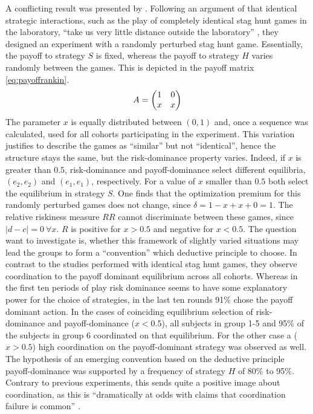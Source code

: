 A conflicting result was presented by \textcite{rankin_strategic_2000}.
Following an argument of \textcite{kreps_game_1990} that identical strategic 
interactions, such as the play of completely identical stag hunt games 
in the laboratory, ``take us very little distance outside the laboratory'' 
\parencite[212]{kreps_game_1990}, 
they designed an experiment with a randomly 
perturbed stag hunt game. Essentially, the payoff to strategy $S$ is fixed, 
whereas the payoff to strategy $H$ varies randomly between the games. This is
depicted in the payoff matrix  \eqref{eq:payoffrankin}.
\begin{align}
        \label{eq:payoffrankin}
        A = \mqty(1 & 0 \\ x & x)
\end{align}        
The parameter $x$ is equally distributed between $(0,1)$ and, once a sequence
was calculated, used for all cohorts participating in the experiment. This
variation justifies to describe the games as ``similar'' but not
``identical'', hence the structure stays the same, but the risk-dominance 
property varies. Indeed, if $x$ is greater than $0.5$, risk-dominance and
payoff-dominance select different equilibria, $(e_2,e_2)$ and $(e_1,e_1)$,
respectively. For a value of $x$ smaller than $0.5$ both select 
the equilibrium in strategy $S$. One finds that the optimization premium for 
this randomly perturbed games does not change, since $\delta=1-x+x+0=1$. 
The relative riskiness measure $RR$ cannot discriminate between these games,
since $|d-c|=0\ \forall x$. $R$ is positive for $x > 0.5$ and 
negative for $x <0.5$. The question \textcite{rankin_strategic_2000}
want to investigate is, whether this framework of slightly varied situations may
lead the groups to form a ``convention'' which deductive principle to choose. 
In contrast to the studies performed with identical stag hunt games, they 
observe coordination to the payoff dominant equilibrium across
all cohorts. Whereas in the first ten periods of play risk dominance seems
to have some explanatory power for the choice of strategies, in the last ten
rounds 91\% chose the payoff dominant action. 
In the cases of coinciding equilibrium selection of risk-dominance and 
payoff-dominance ($x < 0.5$), all subjects in group 1-5 
and 95\% of the subjects in group 6 coordinated on that equilibrium.
For the other case a ($x >0.5$) high coordination on the payoff-dominant 
strategy was observed as well.
The hypothesis of an emerging convention based on the deductive principle
payoff-dominance was supported by a frequency of strategy $H$ of 80\% to 95\%.
Contrary to previous experiments, this sends 
quite a positive image about coordination, as this is 
``dramatically at odds with claims that coordination failure is common''
\parencite[9]{devetag_when_2007}. 


